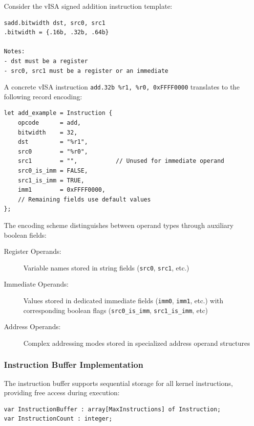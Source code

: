 Consider the vISA signed addition instruction template:

\begin{lstlisting}[caption={vISA Signed Addition Template}]
sadd.bitwidth dst, src0, src1
.bitwidth = {.16b, .32b, .64b}

Notes:
- dst must be a register
- src0, src1 must be a register or an immediate
\end{lstlisting}

A concrete vISA instruction \lstinline{add.32b %r1, %r0, 0xFFFF0000} translates
to the following record encoding:

\begin{lstlisting}[caption={Instruction Record Encoding Example}, label={lst:encoding_example}]
let add_example = Instruction {
    opcode      = add,
    bitwidth    = 32,
    dst         = "%r1",
    src0        = "%r0",
    src1        = "",           // Unused for immediate operand
    src0_is_imm = FALSE,
    src1_is_imm = TRUE,
    imm1        = 0xFFFF0000,
    // Remaining fields use default values
};
\end{lstlisting}

The encoding scheme distinguishes between operand types through auxiliary boolean fields:

\begin{description}
    \item[Register Operands:] Variable names stored in string fields
    (\lstinline{src0}, \lstinline{src1}, etc.)
    \item[Immediate Operands:] Values stored in dedicated immediate fields
    (\lstinline{imm0}, \lstinline{imm1}, etc.) with corresponding boolean flags
    (\lstinline{src0_is_imm}, \lstinline{src1_is_imm}, etc)
    \item[Address Operands:] Complex addressing modes stored in specialized
    address operand structures
\end{description}


\subsubsection{Instruction Buffer Implementation}
\label{subsubsec:instruction_buffer_impl}

The instruction buffer supports sequential storage for all kernel instructions,
providing free access during execution:

\begin{lstlisting}[caption={Instruction Buffer Declaration}, label={lst:instruction_buffer}]
var InstructionBuffer : array[MaxInstructions] of Instruction;
var InstructionCount : integer;
\end{lstlisting}

